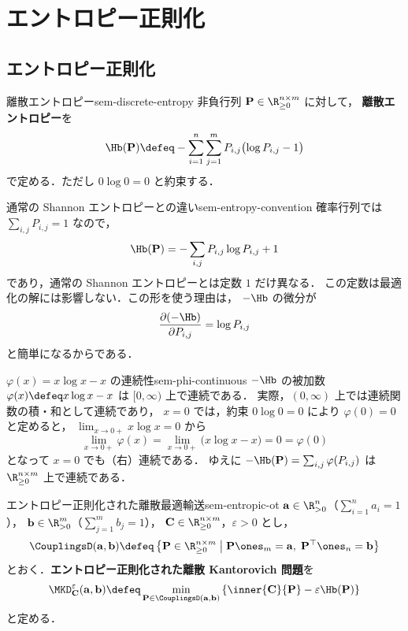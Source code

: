 \chapter{エントロピー正則化}
\label{ch:seminar-03-entropic}

\section{エントロピー正則化}
\label{sec:sem-entropic-regularization}

\begin{definition}{離散エントロピー}{sem-discrete-entropy}
  非負行列 $\mathbf{P} \in \R_{\geq 0}^{n \times m}$ に対して，
  \textbf{離散エントロピー}を
  \[
    \Hb(\mathbf{P})
    \defeq
    - \sum_{i=1}^{n} \sum_{j=1}^{m}
      P_{i,j}\bigl(\log P_{i,j} - 1\bigr)
  \]
  で定める．ただし $0\log 0 = 0$ と約束する．
\end{definition}

\begin{remark}{通常の Shannon エントロピーとの違い}{sem-entropy-convention}
  確率行列では $\sum_{i,j}P_{i,j}=1$ なので，
  \[
    \Hb(\mathbf{P})
    =
    -\sum_{i,j} P_{i,j}\log P_{i,j} + 1
  \]
  であり，通常の Shannon エントロピーとは定数 $1$ だけ異なる．
  この定数は最適化の解には影響しない．この形を使う理由は，
  $-\Hb$ の微分が
  \[
    \frac{\partial(-\Hb)}{\partial P_{i,j}} = \log P_{i,j}
  \]
  と簡単になるからである．
\end{remark}

\begin{remark}{$\varphi(x)=x\log x-x$ の連続性}{sem-phi-continuous}
  $-\Hb$ の被加数 $\varphi(x) \defeq x\log x - x$ は $[0,\infty)$ 上で連続である．
  実際，$(0,\infty)$ 上では連続関数の積・和として連続であり，
  $x = 0$ では，約束 $0\log 0 = 0$ により $\varphi(0) = 0$ と定めると，
  $\lim_{x\to0+} x\log x = 0$ から
  \[
    \lim_{x \to 0+} \varphi(x)
    = \lim_{x \to 0+}\bigl(x\log x - x\bigr) = 0 = \varphi(0)
  \]
  となって $x = 0$ でも（右）連続である．
  ゆえに $-\Hb(\mathbf{P}) = \sum_{i,j}\varphi(P_{i,j})$ は
  $\R_{\geq 0}^{n\times m}$ 上で連続である．
\end{remark}

\begin{definition}{エントロピー正則化された離散最適輸送}{sem-entropic-ot}
  $\mathbf{a} \in \R_{>0}^n$（$\sum_{i=1}^n a_i = 1$），
  $\mathbf{b} \in \R_{>0}^m$（$\sum_{j=1}^m b_j = 1$），
  $\mathbf{C} \in \R_{\geq 0}^{n \times m}$，$\varepsilon > 0$ とし，
  \[
    \CouplingsD(\mathbf{a}, \mathbf{b})
    \defeq
    \left\{
      \mathbf{P} \in \R_{\geq 0}^{n \times m}
      \;\middle|\;
      \mathbf{P}\ones_m = \mathbf{a},\;
      \mathbf{P}^\top\ones_n = \mathbf{b}
    \right\}
  \]
  とおく．\textbf{エントロピー正則化された離散 Kantorovich 問題}を
  \[
    \MKD_{\mathbf{C}}^\varepsilon(\mathbf{a}, \mathbf{b})
    \defeq
    \min_{\mathbf{P} \in \CouplingsD(\mathbf{a}, \mathbf{b})}
    \left\{
      \inner{\mathbf{C}}{\mathbf{P}}
      - \varepsilon \Hb(\mathbf{P})
    \right\}
  \]
  と定める．
\end{definition}

